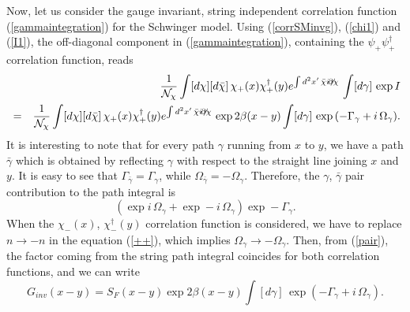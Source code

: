 \documentclass[a4paper,12pt]{article}
\begin{document}
Now, let us consider the gauge invariant, string independent correlation function
(\ref{gammaintegration}) for the Schwinger model. Using (\ref{corrSMinvg}), (\ref{chi1}) and (\ref{I1}), the off-diagonal component in (\ref{gammaintegration}), containing the $\psi_+ \psi^\dagger_+$ correlation function, reads
\begin{eqnarray}
&&\frac{1}{{\cal N}_\chi}\int [d\chi][d\bar{\chi}]\,\chi_+ (x)\chi^\dagger_+(y) e^{\int d^2x'\, \bar{\chi}i\not\!\partial \chi} \, \int [d\gamma]\,\exp {I}\nonumber \\
& = & \frac{1}{{\cal N}_\chi}\int [d\chi][d\bar{\chi}]\,\chi_+ (x)\chi^\dagger_+(y) e^{\int d^2x'\, \bar{\chi}i\not\!\partial \chi} \, \exp{2\beta (x- y) }
 \int [d\gamma]\,\exp {(- \Gamma_\gamma + i\,\Omega_\gamma)}.\nonumber \\
\label{offd}
\end{eqnarray}
It is interesting to note that for every path $\gamma$ running from $x$ to $y$, we have a path $\bar{\gamma}$ which is obtained by reflecting $\gamma$ with respect to the straight 
line joining $x$ and $y$. It is easy to see that $\Gamma_{\bar{\gamma}}=\Gamma_\gamma$, while 
$\Omega_{\bar{\gamma}}=-\Omega_\gamma$. Therefore, the $\gamma$, $\bar{\gamma}$ pair contribution to the path integral is
\begin{equation}
(\exp i\,\Omega_\gamma + \exp -i\,\Omega_\gamma)\exp -\Gamma_\gamma.
\label{pair}
\end{equation}
When the $\chi_- (x)$, $\chi^\dagger_-(y)$ correlation function is considered, we have to replace  $n\to -n$ in the equation (\ref{++}), which implies $\Omega_\gamma \to -\Omega_\gamma$. Then, from (\ref{pair}), the factor coming from the string path integral coincides for both correlation functions, and we can write
\begin{equation}
G_{inv}(x-y) = S_F(x-y)\exp{2\beta (x- y) }
\int [d\gamma]\,\exp {(- \Gamma_\gamma + i\,\Omega_\gamma)}.
\label{invs}
\end{equation}
\end{document}

